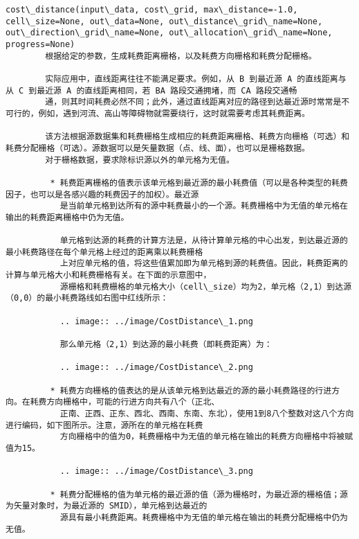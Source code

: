 \documentclass[11pt]{article}
\begin{document}
\begin{Verbatim}[commandchars=\\\{\}]
    cost\_distance(input\_data, cost\_grid, max\_distance=-1.0, cell\_size=None, out\_data=None, out\_distance\_grid\_name=None, out\_direction\_grid\_name=None, out\_allocation\_grid\_name=None, progress=None)
        根据给定的参数，生成耗费距离栅格，以及耗费方向栅格和耗费分配栅格。
        
        实际应用中，直线距离往往不能满足要求。例如，从 B 到最近源 A 的直线距离与从 C 到最近源 A 的直线距离相同，若 BA 路段交通拥堵，而 CA 路段交通畅
        通，则其时间耗费必然不同；此外，通过直线距离对应的路径到达最近源时常常是不可行的，例如，遇到河流、高山等障碍物就需要绕行，这时就需要考虑其耗费距离。
        
        该方法根据源数据集和耗费栅格生成相应的耗费距离栅格、耗费方向栅格（可选）和耗费分配栅格（可选）。源数据可以是矢量数据（点、线、面），也可以是栅格数据。
        对于栅格数据，要求除标识源以外的单元格为无值。
        
         * 耗费距离栅格的值表示该单元格到最近源的最小耗费值（可以是各种类型的耗费因子，也可以是各感兴趣的耗费因子的加权）。最近源
           是当前单元格到达所有的源中耗费最小的一个源。耗费栅格中为无值的单元格在输出的耗费距离栅格中仍为无值。
        
           单元格到达源的耗费的计算方法是，从待计算单元格的中心出发，到达最近源的最小耗费路径在每个单元格上经过的距离乘以耗费栅格
           上对应单元格的值，将这些值累加即为单元格到源的耗费值。因此，耗费距离的计算与单元格大小和耗费栅格有关。在下面的示意图中，
           源栅格和耗费栅格的单元格大小（cell\_size）均为2，单元格（2,1）到达源（0,0）的最小耗费路线如右图中红线所示：
        
           .. image:: ../image/CostDistance\_1.png
        
           那么单元格（2,1）到达源的最小耗费（即耗费距离）为：
        
           .. image:: ../image/CostDistance\_2.png
        
         * 耗费方向栅格的值表达的是从该单元格到达最近的源的最小耗费路径的行进方向。在耗费方向栅格中，可能的行进方向共有八个（正北、
           正南、正西、正东、西北、西南、东南、东北），使用1到8八个整数对这八个方向进行编码，如下图所示。注意，源所在的单元格在耗费
           方向栅格中的值为0，耗费栅格中为无值的单元格在输出的耗费方向栅格中将被赋值为15。
        
           .. image:: ../image/CostDistance\_3.png
        
         * 耗费分配栅格的值为单元格的最近源的值（源为栅格时，为最近源的栅格值；源为矢量对象时，为最近源的 SMID），单元格到达最近的
           源具有最小耗费距离。耗费栅格中为无值的单元格在输出的耗费分配栅格中仍为无值。
        

\end{Verbatim}
\end{document}
